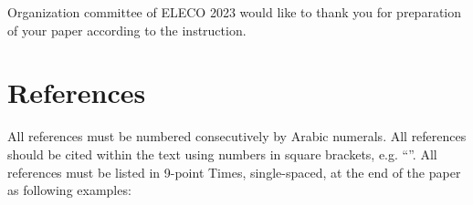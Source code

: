 \documentclass[9pt]{extarticle}
\begin{document}
Organization committee of ELECO 2023 would like to thank you for preparation of your paper according to the instruction.

\section{References}

All references must be numbered consecutively by Arabic numerals. All references should be cited within the text using numbers in square brackets, e.g. ``\cite{journal_paper,book}''. All references must be listed in 9-point Times, single-spaced, at the end of the paper as following examples:
\nocite{*}


\end{document}
